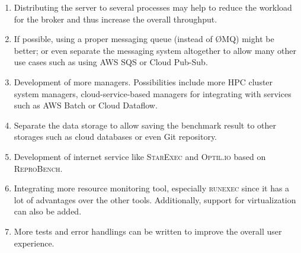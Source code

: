 \begin{enumerate}
    \item Distributing the server to several processes may help to reduce the workload for the broker and thus increase the overall throughput.
    \item If possible, using a proper messaging queue (instead of \O MQ) might be better; or even separate the messaging system altogether to allow many other use cases such as using AWS SQS or Cloud Pub-Sub.
    \item Development of more managers. Possibilities include more HPC cluster system managers, cloud-service-based managers for integrating with services such as AWS Batch or Cloud Dataflow.
    \item Separate the data storage to allow saving the benchmark result to other storages such as cloud databases or even Git repository.
    \item Development of internet service like \textsc{StarExec} and \textsc{Optil.io} based on \textsc{ReproBench}.
    \item Integrating more resource monitoring tool, especially \textsc{runexec} since it has a lot of advantages over the other tools. Additionally, support for virtualization can also be added.
    \item More tests and error handlings can be written to improve the overall user experience.
\end{enumerate}
